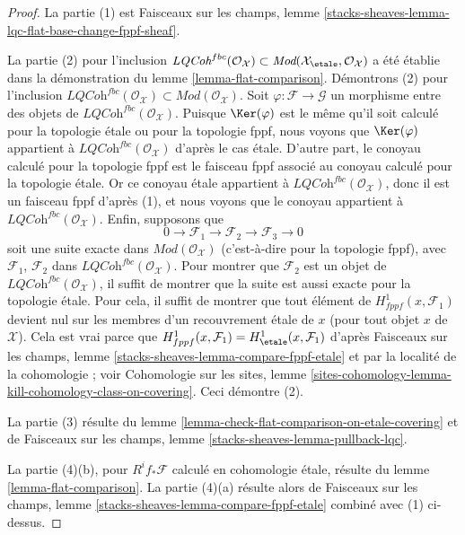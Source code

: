 \begin{proof}
La partie (1) est
Faisceaux sur les champs, lemme
\ref{stacks-sheaves-lemma-lqc-flat-base-change-fppf-sheaf}.

\medskip\noindent
La partie (2) pour l'inclusion
$\textit{LQCoh}^{fbc}(\mathcal{O}_\mathcal{X}) \subset
\textit{Mod}(\mathcal{X}_\etale, \mathcal{O}_\mathcal{X})$
a été établie dans la démonstration du
lemme \ref{lemma-flat-comparison}.
Démontrons (2) pour l'inclusion
$\textit{LQCoh}^{fbc}(\mathcal{O}_\mathcal{X}) \subset
\textit{Mod}(\mathcal{O}_\mathcal{X})$.
Soit $\varphi : \mathcal{F} \to \mathcal{G}$ un morphisme entre des
objets de $\textit{LQCoh}^{fbc}(\mathcal{O}_\mathcal{X})$. Puisque
$\Ker(\varphi)$
est le même qu'il soit calculé pour la topologie étale ou pour la topologie
fppf, nous voyons que $\Ker(\varphi)$ appartient à
$\textit{LQCoh}^{fbc}(\mathcal{O}_\mathcal{X})$
d'après le cas étale. D'autre part,
le conoyau calculé pour la topologie fppf est le faisceau fppf associé
au conoyau calculé pour la topologie étale. Or ce
conoyau étale appartient à $\textit{LQCoh}^{fbc}(\mathcal{O}_\mathcal{X})$,
donc il est un faisceau fppf
d'après (1), et nous voyons que le conoyau appartient à
$\textit{LQCoh}^{fbc}(\mathcal{O}_\mathcal{X})$.
Enfin, supposons que
$$
0 \to \mathcal{F}_1 \to \mathcal{F}_2 \to \mathcal{F}_3 \to 0
$$
soit une suite exacte dans $\textit{Mod}(\mathcal{O}_\mathcal{X})$
(c'est-à-dire pour la topologie fppf), avec $\mathcal{F}_1$, $\mathcal{F}_2$
dans $\textit{LQCoh}^{fbc}(\mathcal{O}_\mathcal{X})$. Pour montrer que
$\mathcal{F}_2$ est un objet de $\textit{LQCoh}^{fbc}(\mathcal{O}_\mathcal{X})$,
il suffit de montrer que
la suite est aussi exacte pour la topologie étale. Pour cela, il
suffit de montrer que tout élément de $H^1_{fppf}(x, \mathcal{F}_1)$
devient nul sur les membres d'un recouvrement étale de $x$ (pour tout
objet $x$ de $\mathcal{X}$). Cela est vrai parce que
$H^1_{fppf}(x, \mathcal{F}_1) = H^1_\etale(x, \mathcal{F}_1)$ d'après
Faisceaux sur les champs, lemme \ref{stacks-sheaves-lemma-compare-fppf-etale}
et par la localité de la cohomologie ; voir
Cohomologie sur les sites, lemme
\ref{sites-cohomology-lemma-kill-cohomology-class-on-covering}.
Ceci démontre (2).

\medskip\noindent
La partie (3) résulte du
lemme \ref{lemma-check-flat-comparison-on-etale-covering}
et de
Faisceaux sur les champs, lemme \ref{stacks-sheaves-lemma-pullback-lqc}.

\medskip\noindent
La partie (4)(b), pour $R^if_*\mathcal{F}$ calculé en cohomologie étale,
résulte du lemme \ref{lemma-flat-comparison}.
La partie (4)(a) résulte alors de
Faisceaux sur les champs, lemme \ref{stacks-sheaves-lemma-compare-fppf-etale}
combiné avec (1) ci-dessus.


\end{proof}
